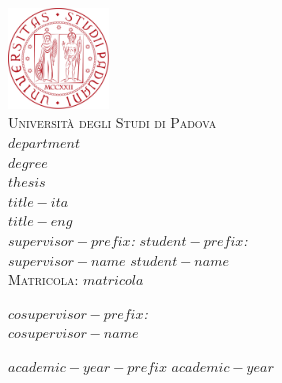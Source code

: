 \begin{center}
\includegraphics[width=0.2\textwidth]{figures/unipd.pdf}\\

\vspace{0.8cm}
\textsc{\LARGE Universit\`{a} degli Studi di Padova}\\
\vspace{0.45cm}
\textsc{\large $department$}\\
\vspace{0.4cm}
\textsc{\large $degree$}\\
\vspace{1cm}
\textsc{\large $thesis$}\\
\vfill
{ \LARGE \bfseries $title-ita$
}\\
\vspace{1cm}
{ \Large $title-eng$
}\\
\vfill
\textit{\large $supervisor-prefix$:} \hfill \textit{\large $student-prefix$:}\\
\vspace{0.2cm}
\textsc{\large $supervisor-name$} \hfill \textsc{\large $student-name$}\\
\vspace{0.2cm}  
\hfill \textsc{Matricola: $matricola$}\\
\begin{flushleft}
\textit{\large $cosupervisor-prefix$:} \\
\vspace{0.2cm}
\textsc{\large $cosupervisor-name$} \hfill
\end{flushleft}

\vfill
{\large $academic-year-prefix$ $academic-year$}
\end{center}
